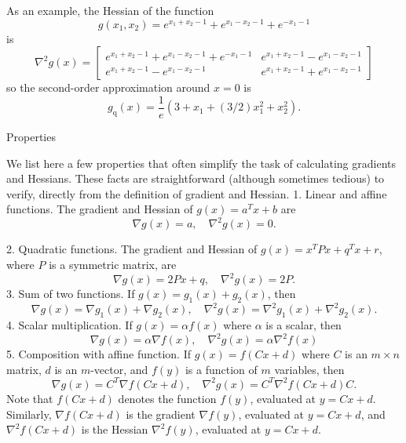 \begin{example}
    As an example, the Hessian of the function
\begin{equation}
g\left(x_{1}, x_{2}\right)=e^{x_{1}+x_{2}-1}+e^{x_{1}-x_{2}-1}+e^{-x_{1}-1}
\end{equation}
is
\begin{equation}
\nabla^{2} g(x)=\left[\begin{array}{cc}
e^{x_{1}+x_{2}-1}+e^{x_{1}-x_{2}-1}+e^{-x_{1}-1} & e^{x_{1}+x_{2}-1}-e^{x_{1}-x_{2}-1} \\
e^{x_{1}+x_{2}-1}-e^{x_{1}-x_{2}-1} & e^{x_{1}+x_{2}-1}+e^{x_{1}-x_{2}-1}
\end{array}\right]
\end{equation}
so the second-order approximation around $ \hat{x}=0 $ is
\begin{equation}
g_{\mathrm{q}}(x)=\frac{1}{e}\left(3+x_{1}+(3 / 2) x_{1}^{2}+x_{2}^{2}\right) .
\end{equation}
\end{example}

Properties 


We list here a few properties that often simplify the task of calculating gradients and Hessians. These facts are straightforward (although sometimes tedious) to verify, directly from the definition of gradient and Hessian.
1. Linear and affine functions. The gradient and Hessian of $ g(x)=a^{T} x+b $ are
\begin{equation}
\nabla g(x)=a, \quad \nabla^{2} g(x)=0 .
\end{equation}

2. Quadratic functions. The gradient and Hessian of $ g(x)=x^{T} P x+q^{T} x+r $, where $ P $ is a symmetric matrix, are
\begin{equation}
\nabla g(x)=2 P x+q, \quad \nabla^{2} g(x)=2 P .
\end{equation}
3. Sum of two functions. If $ g(x)=g_{1}(x)+g_{2}(x) $, then
\begin{equation}
\nabla g(x)=\nabla g_{1}(x)+\nabla g_{2}(x), \quad \nabla^{2} g(x)=\nabla^{2} g_{1}(x)+\nabla^{2} g_{2}(x) .
\end{equation}
4. Scalar multiplication. If $ g(x)=\alpha f(x) $ where $ \alpha $ is a scalar, then
\begin{equation}
\nabla g(x)=\alpha \nabla f(x), \quad \nabla^{2} g(x)=\alpha \nabla^{2} f(x)
\end{equation}
5. Composition with affine function. If $ g(x)=f(C x+d) $ where $ C $ is an $ m \times n $ matrix, $ d $ is an $ m $-vector, and $ f(y) $ is a function of $ m $ variables, then
\begin{equation}
\nabla g(x)=C^{T} \nabla f(C x+d), \quad \nabla^{2} g(x)=C^{T} \nabla^{2} f(C x+d) C .
\end{equation}
Note that $ f(C x+d) $ denotes the function $ f(y) $, evaluated at $ y=C x+d $. Similarly, $ \nabla f(C x+d) $ is the gradient $ \nabla f(y) $, evaluated at $ y=C x+d $, and $ \nabla^{2} f(C x+d) $ is the Hessian $ \nabla^{2} f(y) $, evaluated at $ y=C x+d $.

